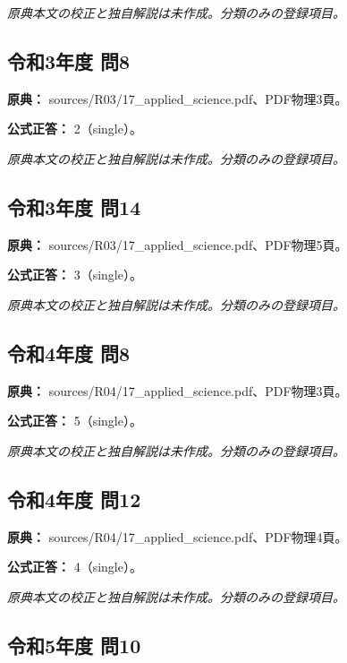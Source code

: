 \par\textit{原典本文の校正と独自解説は未作成。分類のみの登録項目。}

\subsection{令和3年度 問8}
\label{q:r03-reg-applied-08}

\noindent\textbf{原典：} sources/R03/17\_applied\_science.pdf、PDF物理3頁。

\textbf{公式正答：} 2（single）。

\par\textit{原典本文の校正と独自解説は未作成。分類のみの登録項目。}

\subsection{令和3年度 問14}
\label{q:r03-reg-applied-14}

\noindent\textbf{原典：} sources/R03/17\_applied\_science.pdf、PDF物理5頁。

\textbf{公式正答：} 3（single）。

\par\textit{原典本文の校正と独自解説は未作成。分類のみの登録項目。}

\subsection{令和4年度 問8}
\label{q:r04-reg-applied-08}

\noindent\textbf{原典：} sources/R04/17\_applied\_science.pdf、PDF物理3頁。

\textbf{公式正答：} 5（single）。

\par\textit{原典本文の校正と独自解説は未作成。分類のみの登録項目。}

\subsection{令和4年度 問12}
\label{q:r04-reg-applied-12}

\noindent\textbf{原典：} sources/R04/17\_applied\_science.pdf、PDF物理4頁。

\textbf{公式正答：} 4（single）。

\par\textit{原典本文の校正と独自解説は未作成。分類のみの登録項目。}

\subsection{令和5年度 問10}
\label{q:r05-reg-applied-10}

